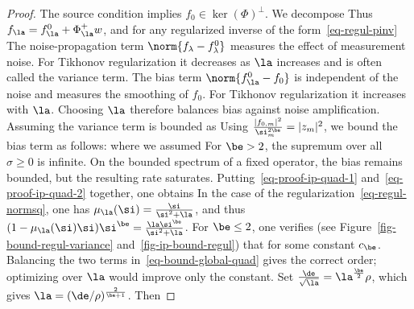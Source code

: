 \begin{proof}
	The source condition implies $f_0\in\ker(\Phi)^\bot$.
	We decompose
	Thus $f_\la = f_{\la}^0 + \Phi_\la^+ w$, and for any regularized inverse of the form~\eqref{eq-regul-pinv}
    The noise-propagation term $\norm{f_\lambda-f_\lambda^0}$ measures the effect of measurement noise. For Tikhonov regularization it decreases as $\la$ increases and is often called the variance term.
    The bias term $\norm{ f_{\la}^0 - f_0 }$ is independent of the noise and measures the smoothing of $f_0$. For Tikhonov regularization it increases with $\la$. Choosing $\la$ therefore balances bias against noise amplification.
	Assuming 
	the variance term is bounded as
	Using $\frac{|f_{0,m}|^2}{\si_m^{2\be}} = |z_m|^2$, we bound the bias term as follows:
	where we assumed
	For $\be>2$, the supremum over all $\sigma\geq0$ is infinite. On the bounded spectrum of a fixed operator, the bias remains bounded, but the resulting rate saturates.
	Putting~\eqref{eq-proof-ip-quad-1} and~\eqref{eq-proof-ip-quad-2} together, one obtains
	In the case of the regularization~\eqref{eq-regul-normsq}, one has $\mu_\la(\si) = \frac{\si}{\si^2+\la}$, and
	thus $( 1 - \mu_\la(\si) \si )\si^{\be} = \frac{\la \si^\be}{\si^2+\la}$. 
	For $\be \leq 2$, one verifies (see Figure~\ref{fig-bound-regul-variance} and~\ref{fig-ip-bound-regul}) that
	for some constant $c_\be$.
    Balancing the two terms in~\eqref{eq-bound-global-quad} gives the correct order; optimizing over $\la$ would improve only the constant. Set $\frac{\de}{\sqrt{\la}} = \la^{\frac{\be}{2}} \rho$, which gives $\la = (\de/\rho)^{\frac{2}{\be+1}}$. Then
\end{proof}



